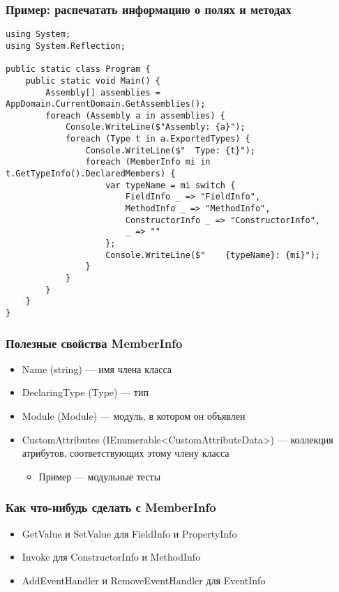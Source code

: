 \documentclass{../../slides-style}
\begin{document}
    \begin{frame}[fragile]
        \frametitle{Пример: распечатать информацию о полях и методах}
        \begin{scriptsize}
            \begin{verbatim}
using System;
using System.Reflection;

public static class Program {
    public static void Main() {
        Assembly[] assemblies = AppDomain.CurrentDomain.GetAssemblies();
        foreach (Assembly a in assemblies) {
            Console.WriteLine($"Assembly: {a}");
            foreach (Type t in a.ExportedTypes) {
                Console.WriteLine($"  Type: {t}");
                foreach (MemberInfo mi in t.GetTypeInfo().DeclaredMembers) {
                    var typeName = mi switch {
                        FieldInfo _ => "FieldInfo",
                        MethodInfo _ => "MethodInfo",
                        ConstructorInfo _ => "ConstructorInfo",
                        _ => ""
                    };
                    Console.WriteLine($"    {typeName}: {mi}");
                }
            }
        }
    }
}
            \end{verbatim}
        \end{scriptsize}
    \end{frame}

    \begin{frame}
        \frametitle{Полезные свойства MemberInfo}
        \begin{itemize}
            \item Name (string) --- имя члена класса
            \item DeclaringType (Type) --- тип
            \item Module (Module) --- модуль, в котором он объявлен
            \item CustomAttributes (IEnumerable<CustomAttributeData>) --- коллекция атрибутов, соответствующих этому члену класса
            \begin{itemize}
                \item Пример --- модульные тесты
            \end{itemize}
        \end{itemize}
    \end{frame}

    \begin{frame}
        \frametitle{Как что-нибудь сделать с MemberInfo}
        \begin{itemize}
            \item GetValue и SetValue для FieldInfo и PropertyInfo
            \item Invoke для ConstructorInfo и MethodInfo
            \item AddEventHandler и RemoveEventHandler для EventInfo
        \end{itemize}
    \end{frame}
\end{document}
